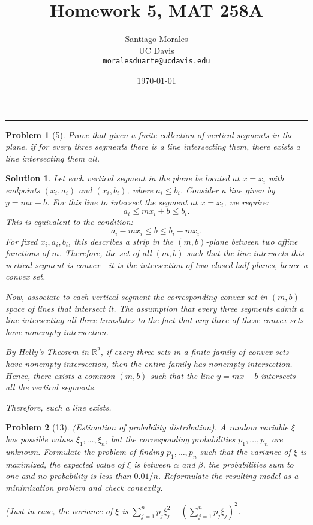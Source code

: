 \documentclass[11pt]{article}
\title{\vspace{-1cm} \textbf{Homework 5, MAT 258A}}
\author{Santiago Morales \\ UC Davis \\ \texttt{moralesduarte@ucdavis.edu}}
\date{\today}
\theoremstyle{mystyle}
\newtheorem{problem}{Problem}
\newtheorem*{solution}{Solution}
\begin{document}
\maketitle
\vspace{-1em}
\hrule
\vspace{1em}

\begin{problem}[5]
Prove that given a finite collection of vertical segments in the plane, if for every three segments there is a line intersecting them, there exists a line intersecting them all.
\end{problem}
        
\begin{solution}
        Let each vertical segment in the plane be located at \(x = x_i\) with endpoints \((x_i, a_i)\) and \((x_i, b_i)\), where \(a_i \leq b_i\). Consider a line given by \(y = mx + b\). For this line to intersect the segment at \(x = x_i\), we require:
        \[
        a_i \leq mx_i + b \leq b_i.
        \]
        This is equivalent to the condition:
        \[
        a_i - mx_i \leq b \leq b_i - mx_i.
        \]
        For fixed \(x_i, a_i, b_i\), this describes a strip in the \((m, b)\)-plane between two affine functions of \(m\). Therefore, the set of all \((m, b)\) such that the line intersects this vertical segment is convex—it is the intersection of two closed half-planes, hence a convex set.
        
        Now, associate to each vertical segment the corresponding convex set in \((m, b)\)-space of lines that intersect it. The assumption that every three segments admit a line intersecting all three translates to the fact that any three of these convex sets have nonempty intersection.
        
        By Helly’s Theorem in \(\mathbb{R}^2\), if every three sets in a finite family of convex sets have nonempty intersection, then the entire family has nonempty intersection. Hence, there exists a common \((m, b)\) such that the line \(y = mx + b\) intersects all the vertical segments.
        
        Therefore, such a line exists.
\end{solution}

\begin{problem}[13]
(Estimation of probability distribution). A random variable \(\xi\) has possible values \(\xi_1, \ldots, \xi_n\), but the corresponding probabilities \(p_1, \ldots, p_n\) are unknown. Formulate the problem of finding \(p_1, \ldots, p_n\) such that the variance of \(\xi\) is maximized, the expected value of \(\xi\) is between \(\alpha\) and \(\beta\), the probabilities sum to one and no probability is less than \(0.01/n\). Reformulate the resulting model as a minimization problem and check convexity.

\emph{(Just in case, the variance of \(\xi\) is \(\sum_{j=1}^n p_j \xi_j^2 - \left(\sum_{j=1}^n p_j \xi_j\right)^2\).}
\end{problem}
\end{document}
